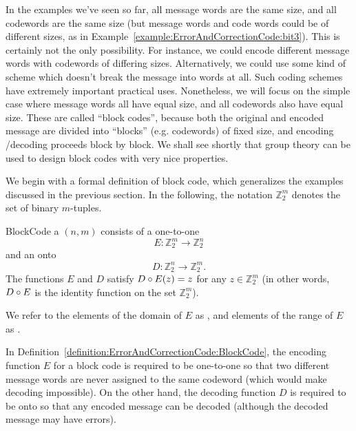 In the examples we've seen so far,  all message words are the same size, and all codewords are the same size (but message words and code words could be of different sizes, as in Example~\ref{example:ErrorAndCorrectionCode:bit3}). This is certainly not the only possibility. For instance, we could encode different message words with codewords of differing sizes. Alternatively, we could use some kind of scheme which doesn't break the message into words at all. Such coding schemes have extremely important practical uses. Nonetheless, we will focus on the simple case where message words all have equal size, and all codewords also have equal size. These are called  ``block codes'', because both the original and encoded message are divided into ``blocks'' (e.g. codewords) of fixed size, and encoding /decoding proceeds block by block.  We shall see shortly that group
theory  can be used to design block codes with very nice properties. 

We begin with a formal definition of block code, which generalizes the examples discussed in the previous section. In the following, the notation $\mathbb{Z}^{m}_{2}$ denotes the set of  binary $m$-tuples.

\begin{defn}{BlockCode}
a $(n, m)$    consists of a one-to-one  
\[
E:\mathbb{Z}^{m}_{2} \rightarrow \mathbb{Z}^{n}_{2}
\]
and an onto  
\[
D:\mathbb{Z}^{n}_{2} \rightarrow \mathbb{Z}^{m}_{2}.
\]
The functions $E$ and $D$ satisfy $D \circ E (z)= z$ for any $z \in \mathbb{Z}_2^m$ (in other words, $D \circ E$ is the identity function on the set $\mathbb{Z}_2^m$).

We refer to the elements of the domain of $E$ as , and elements of the range of $E$ as . 
\end{defn}

\begin{rem}
In Definition~\ref{definition:ErrorAndCorrectionCode:BlockCode}, the encoding function $E$ for a block code is required to be one-to-one so that two different message words are never assigned to the same codeword (which would make decoding impossible). On the other hand, the decoding function $D$  is required to be onto so that any encoded message can be decoded (although the decoded message may have errors).
\end{rem}

